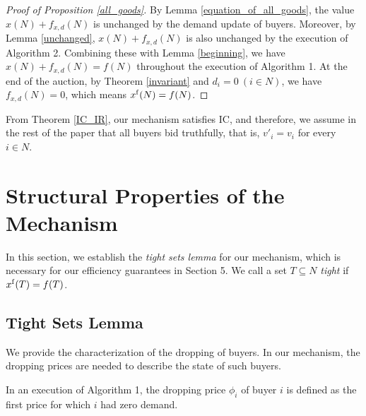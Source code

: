 \documentclass[letterpaper,11pt]{article}
\begin{document}
\begin{proof}[Proof of Proposition \ref{all_goods}]
By Lemma \ref{equation_of_all_goods}, 
the value $x(N)+f_{x,d}(N)$ is unchanged by the demand update of buyers.
Moreover, by Lemma \ref{unchanged}, $x(N)+f_{x,d}(N)$ is also unchanged by the execution of Algorithm 2.
Combining these with Lemma \ref{beginning}, 
we have $x(N)+f_{x,d}(N)=f(N)$ throughout the execution of Algorithm 1.
At the end of the auction, by Theorem \ref{invariant} and $d_i=0\ (i\in N)$, we have $f_{x,d}(N)=0$,
which means $x^{\rm f}(N)=f(N)$.
\end{proof}


From Theorem \ref{IC_IR}, our mechanism satisfies IC, and therefore, 
we assume in the rest of the paper that all buyers bid truthfully, that is, $v'_i=v_i$ for every $i\in N$. 




\section{Structural Properties of the Mechanism}
In this section, we establish the {\it tight sets lemma} for our mechanism,
which is necessary for our efficiency guarantees in Section 5.  
We call a set $T\subseteq N$ {\it tight} if $x^{\rm f}(T)=f(T)$.


\subsection{Tight Sets Lemma}	 
	We provide the characterization of the dropping of buyers.
	In our mechanism, the dropping prices are needed to describe the state of such buyers.
	

	\begin{definition}
	{\rm In an execution of Algorithm 1, the} dropping price 
	{\rm $\phi_i$ of buyer  $i$ is defined as the first price for which $i$ had zero demand.}
	\end{definition}
\end{document}
